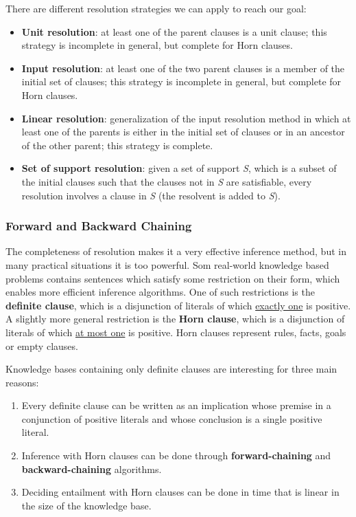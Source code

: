 \documentclass{article}
\begin{document}
There are different resolution strategies we can apply to reach our goal:
\begin{itemize}
    \item \textbf{Unit resolution}: at least one of the parent clauses is a unit clause; this strategy is incomplete in general, but complete for Horn clauses.
    \item \textbf{Input resolution}: at least one of the two parent clauses is a member of the initial set of clauses; this strategy is incomplete in general, but complete for Horn clauses.
    \item \textbf{Linear resolution}: generalization of the input resolution method in which at least one of the parents is either in the initial set of clauses or in an ancestor of the other parent; this strategy is complete.
    \item \textbf{Set of support resolution}: given a set of support \textit{S}, which is a subset of the initial clauses such that the clauses not in \textit{S} are satisfiable, every resolution involves a clause in \textit{S} (the resolvent is added to \textit{S}).
\end{itemize}

\subsubsection{Forward and Backward Chaining}
The completeness of resolution makes it a very effective inference method, but in many practical situations it is too powerful. Som real-world knowledge based problems contains sentences which satisfy some restriction on their form, which enables more efficient inference algorithms. One of such restrictions is the \textbf{definite clause}, which is a disjunction of literals of which \underline{exactly one} is positive. A slightly more general restriction is the \textbf{Horn clause}, which is a disjunction of literals of which \underline{at most one} is positive. Horn clauses represent rules, facts, goals or empty clauses.

Knowledge bases containing only definite clauses are interesting for three main reasons:
\begin{enumerate}
    \item Every definite clause can be written as an implication whose premise in a conjunction of positive literals and whose conclusion is a single positive literal.
    \item Inference with Horn clauses can be done through \textbf{forward-chaining} and \textbf{backward-chaining} algorithms.
    \item Deciding entailment with Horn clauses can be done in time that is linear in the size of the knowledge base.
\end{enumerate}
\end{document}
